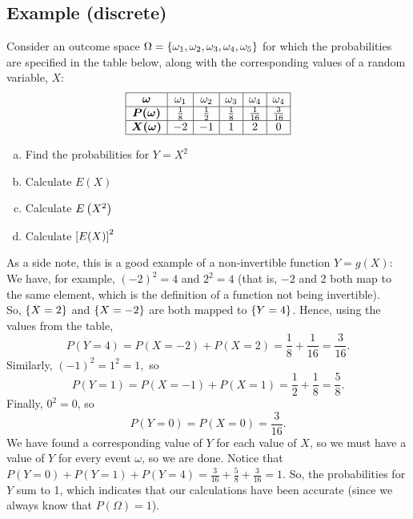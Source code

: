 \subsection{Example (discrete)} \label{ex22.1}
Consider an outcome space $\Omega = \left\{\omega_1,\omega_2,\omega_3,\omega_4,\omega_5\right\}$ for which the probabilities are specified in the table below, along with the corresponding values of a random variable, $X$:
\[
\begin{array}{|c|c|c|c|c|c|} \hline
\boldsymbol{\omega}       & \omega_1   & \omega_2  & \omega_3& \omega_4& \omega_4 \\ \hline
\boldsymbol{P(\omega)}  & \frac{1}{8}&\frac{1}{2}&\frac{1}{8}&\frac{1}{16}&\frac{3}{16} \\ \hline
\boldsymbol{X(\omega)}  & -2         	     &      -1          &         1         &       2           &     0     \\ \hline
\end{array}
\]
\begin{enumerate}[(a)]
\item Find the probabilities for $Y = X^2$
\item Calculate $E(X)$
\item Calculate $E\left(X^2\right)$
\item Calculate $\left[E(X)\right]^2$
\end{enumerate}
\bigskip

\solution[to (a)]
As a side note, this is a good example of a non-invertible function $Y = g(X)$: We have, for example, $(-2)^2 = 4$ and $2^2 = 4$ (that is, $-2$ and 2 both map to the same element, which is the definition of a function not being invertible). \\

\noindent So, $\left\{X = 2\right\}$ and $\left\{X = -2\right\}$ are both mapped to $\left\{Y = 4\right\}$. Hence, using the values from the table,
\[
P(Y = 4) = P(X = -2) + P(X = 2) = \frac{1}{8} + \frac{1}{16} = \frac{3}{16}.
\]
Similarly, $(-1)^2 = 1^2 = 1,$ so 
\[
P(Y = 1) = P(X = -1) + P(X = 1) = \frac{1}{2} + \frac{1}{8} = \frac{5}{8}.
\]
Finally, $0^2 = 0$, so
\[
P(Y = 0) = P(X = 0) = \frac{3}{16}.
\]
We have found a corresponding value of $Y$ for each value of $X$, so we must have a value of $Y$ for every event $\omega$, so we are done. Notice that $P(Y = 0) + P(Y = 1) + P(Y = 4) = \frac{3}{16} + \frac{5}{8} + \frac{3}{16} = 1$. So, the probabilities for $Y$ sum to 1, which indicates that our calculations have been accurate (since we always know that $P(\Omega) = 1$). \\
\bigskip

